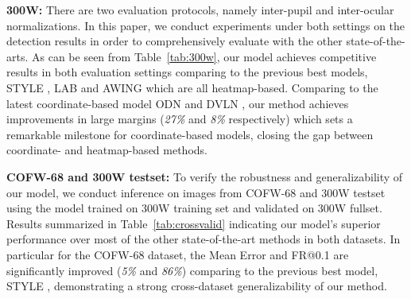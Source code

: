 \documentclass[runningheads]{llncs}
\begin{document}
\noindent\textbf{300W:} There are two evaluation protocols, namely inter-pupil and inter-ocular normalizations. In this paper, we conduct experiments under both settings on the detection results in order to comprehensively evaluate with the other state-of-the-arts. As can be seen from Table~\ref{tab:300w}, our model achieves competitive results in both evaluation settings comparing to the previous best models, STYLE \cite{qian2019aggregation}, LAB \cite{wu2018look} and AWING \cite{wang2019adaptive} which are all heatmap-based. Comparing to the latest coordinate-based model ODN \cite{zhu2019robust} and DVLN \cite{wu2017leveraging}, our method achieves improvements in large margins (\textit{27\%} and \textit{8\%} respectively) which sets a remarkable milestone for coordinate-based models, closing the gap between coordinate- and heatmap-based methods.

\noindent\textbf{COFW-68 and 300W testset:} To verify the robustness and generalizability of our model, we conduct inference on images from COFW-68 and 300W testset using the model trained on 300W training set and validated on 300W fullset. Results summarized in Table~\ref{tab:crossvalid} indicating our model's superior performance over most of the other state-of-the-art methods in both datasets. In particular for the COFW-68 dataset, the Mean Error and FR@0.1 are significantly improved (\textit{5\%} and \textit{86\%}) comparing to the previous best model, STYLE \cite{qian2019aggregation}, demonstrating a strong cross-dataset generalizability of our method.
\end{document}
